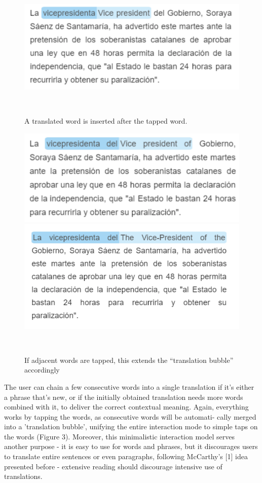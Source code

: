 \begin{figure}[h!]
\centering
  \includegraphics[width=0.7\columnwidth]{figures/translated_word}
  \caption{A translated word is inserted after the tapped word.}~\label{fig:registrations}
\end{figure}

\begin{figure}[h!]
\centering
  \includegraphics[width=0.7\columnwidth]{figures/translated_words1}
  \includegraphics[width=0.7\columnwidth]{figures/translated_words2}
  \caption{If adjacent words are tapped, this extends the ``translation bubble'' accordingly}~\label{fig:registrations}
\end{figure}

The user can chain a few consecutive words into a single translation if it’s either a phrase that’s new, or if the initially obtained translation needs more words combined with it, to deliver the correct contextual meaning. Again, everything works by tapping the words, as consecutive words will be automati- cally merged into a ’translation bubble’, unifying the entire interaction mode to simple taps on the words (Figure 3). Moreover, this minimalistic interaction model serves another purpose - it is easy to use for words and phrases, but it discourages users to translate entire sentences or even paragraphs, following McCarthy’s [1] idea presented before - extensive reading should discourage intensive use of translations.

